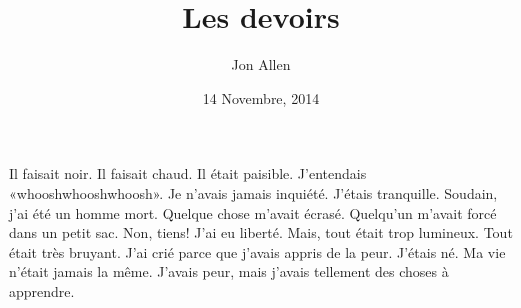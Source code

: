 \documentclass[letterpaper]{article}
\begin{document}
\title{Les devoirs}
\date{14 Novembre, 2014}
\author{Jon Allen}
\maketitle
\begin{spacing}{3.0}
Il faisait noir. Il faisait chaud. Il était paisible. J'entendais «whooshwhooshwhoosh». Je n'avais jamais inquiété. J'étais tranquille. Soudain, j'ai été un homme mort. Quelque chose m'avait écrasé. Quelqu'un m'avait forcé dans un petit sac. Non, tiens! J'ai eu liberté. Mais, tout était trop lumineux. Tout était très bruyant. J'ai crié parce que j'avais appris de la peur. J'étais né. Ma vie n'était jamais la même. J'avais peur, mais j'avais tellement des choses à apprendre.
\end{spacing}
\end{document}
